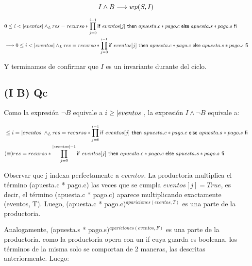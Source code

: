 \documentclass[10pt,a4paper]{article}
\begin{document}
\begin{equation}
	I \land B \longrightarrow wp(S,I)
\end{equation}

\begin{equation}
\begin{split}
	& 0 \leq i < |eventos| \land _L
	res = recurso * \prod\limits_{j=0}^{i-1} \mathsf{if}\ eventos[j]\ \mathsf{then}\ apuesta.c * pago.c\ \mathsf{else}\ apuesta.s * pago.s\ \mathsf{fi}\\
	&\longrightarrow 0 \leq i < |eventos| \land _L res = recurso * \prod\limits_{j=0}^{i-1} \mathsf{if}\ eventos[j]\ \mathsf{then}\ apuesta.c * pago.c\ \mathsf{else}\ apuesta.s * pago.s\ \mathsf{fi}
\end{split}
\end{equation}

 Y terminamos de confirmar que $I$ es un invariante durante del ciclo.

\subsection{(I \land \neg B) \implica Qc}

 Como la expresión $\neg B$ equivale a $i \geq |eventos|$, la expresión $I \land \neg B$ equivale a:
 
\begin{equation}
\begin{split}
	& \leq i = \longitud{eventos} \yLuego
	  res = recurso * \prod\limits_{j=0}^{i-1} \IfThenElse{eventos[j]}{apuesta.c * pago.c}{apuesta.s * pago.s}\\

	& (\equiv) res = recurso * \prod\limits_{j=0}^{\longitud{eventos}-1} \IfThenElse{eventos[j]}{apuesta.c * pago.c}{apuesta.s * pago.s}\\
\end{split}
\end{equation}

 Observar que j indexa perfectamente a $eventos$. La productoria multiplica el término (apuesta.c * pago.c) las veces que se cumpla $ eventos[j] = True$,
 es decir, el término (apuesta.c * pago.c) aparece multiplicando exactamente (eventos, T). Luego,
 (apuesta.c * pago.c)$^{apariciones(eventos, T)}$ es una parte de la productoria.

\vspace{0.3cm}
  
 Analogamente, (apuesta.s * pago.s)$^{apariciones(eventos, F)}$ es una parte de la productoria. como la productoria
 opera con un if cuya guarda es booleana, los términos de la misma solo se comportan de 2 maneras, las descritas anteriormente.
 Luego:
\end{document}
